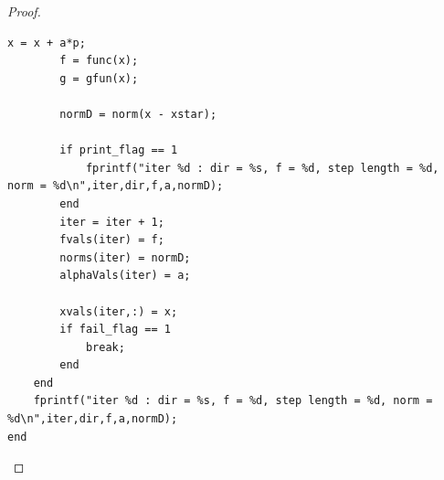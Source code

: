 \documentclass[12pt]{report}
\begin{document}
\begin{problem}
\begin{proof}
\begin{lstlisting}[style=Matlab-editor]
        x = x + a*p;
        f = func(x);
        g = gfun(x);
        
        normD = norm(x - xstar);
        
        if print_flag == 1
            fprintf("iter %d : dir = %s, f = %d, step length = %d, norm = %d\n",iter,dir,f,a,normD);
        end
        iter = iter + 1;
        fvals(iter) = f;
        norms(iter) = normD;
        alphaVals(iter) = a;
        
        xvals(iter,:) = x;
        if fail_flag == 1
            break;
        end
    end
    fprintf("iter %d : dir = %s, f = %d, step length = %d, norm = %d\n",iter,dir,f,a,normD);
end
\end{lstlisting}
\end{proof}
\end{problem}
\end{document}
